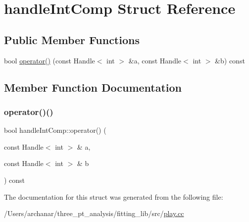 \hypertarget{structhandleIntComp}{}\section{handle\+Int\+Comp Struct Reference}
\label{structhandleIntComp}
\subsection*{Public Member Functions}
\begin{DoxyCompactItemize}
\item 
bool \mbox{\hyperlink{structhandleIntComp_aa90b829f9f703812a3c8951d284287bd}{operator()}} (const Handle$<$ int $>$ \&a, const Handle$<$ int $>$ \&b) const
\end{DoxyCompactItemize}


\subsection{Member Function Documentation}
\mbox{\label{structhandleIntComp_aa90b829f9f703812a3c8951d284287bd}} 
\subsubsection{\texorpdfstring{operator()()}{operator()()}}
{\footnotesize\ttfamily bool handle\+Int\+Comp\+::operator() (\begin{DoxyParamCaption}\item[{const Handle$<$ int $>$ \&}]{a,  }\item[{const Handle$<$ int $>$ \&}]{b }\end{DoxyParamCaption}) const\hspace{0.3cm}{\ttfamily [inline]}}



The documentation for this struct was generated from the following file\+:\begin{DoxyCompactItemize}
\item 
/\+Users/archanar/three\+\_\+pt\+\_\+analysis/fitting\+\_\+lib/src/\mbox{\hyperlink{play_8cc}{play.\+cc}}\end{DoxyCompactItemize}

